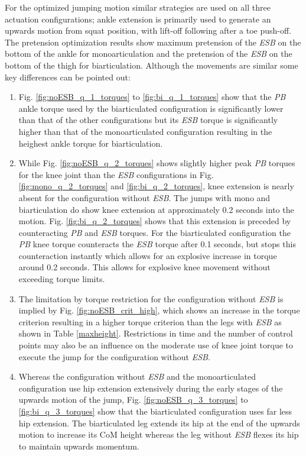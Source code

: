 \documentclass[letterpaper, 10 pt, conference]{ieeeconf}  %
\begin{document}
	For the optimized jumping motion similar strategies are used on all three actuation configurations; ankle extension is primarily used to generate an upwards motion from squat position, with lift-off following after a toe push-off. The pretension optimization results show maximum pretension of the \textit{ESB} on the bottom of the ankle for monoarticulation and the pretension of the \textit{ESB} on the bottom of the thigh for biarticulation. Although the movements are similar some key differences can be pointed out:
	\begin{enumerate}
		\item Fig. \ref{fig:noESB_q_1_torques} to \ref{fig:bi_q_1_torques} show that the \textit{PB} ankle torque used by the biarticulated configuration is significantly lower than that of the other configurations but its \textit{ESB} torque is significantly higher than that of the monoarticulated configuration resulting in the heighest ankle torque for biarticulation. 
		
		\item While Fig. \ref{fig:noESB_q_2_torques} shows slightly higher peak \textit{PB} torques for the knee joint than the \textit{ESB} configurations in Fig. \ref{fig:mono_q_2_torques} and \ref{fig:bi_q_2_torques}, knee extension is nearly absent for the configuration without \textit{ESB}. The jumps with mono and biarticulation do show knee extension at approximately 0.2 seconds into the motion. Fig. \ref{fig:bi_q_2_torques} shows that this extension is preceded by counteracting \textit{PB} and \textit{ESB} torques. For the biarticulated configuration the \textit{PB} knee torque counteracts the \textit{ESB} torque after 0.1 seconds, but stops this counteraction instantly which allows for an explosive increase in torque around 0.2 seconds. This allows for explosive knee movement without exceeding torque limits.
		
		\item The limitation by torque restriction for the configuration without \textit{ESB} is implied by Fig. \ref{fig:noESB_crit_high}, which shows an increase in the torque criterion resulting in a higher torque criterion than the legs with \textit{ESB} as shown in Table \ref{maxheight}. Restrictions in time and the number of control points may also be an influence on the moderate use of knee joint torque to execute the jump for the configuration without \textit{ESB}.
		
		\item Whereas the configuration without \textit{ESB} and the monoarticulated configuration use hip extension extensively during the early stages of the upwards motion of the jump, Fig. \ref{fig:noESB_q_3_torques} to \ref{fig:bi_q_3_torques} show that the biarticulated configuration uses far less hip extension. The biarticulated leg extends its hip at the end of the upwards motion to increase its CoM height whereas the leg without \textit{ESB} flexes its hip to maintain upwards momentum.
		

\end{enumerate}
\end{document}
